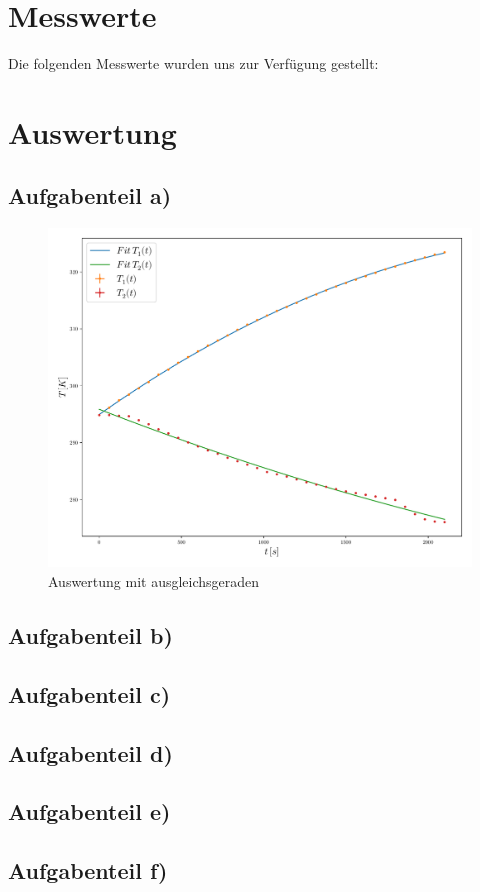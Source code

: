 \newpage
    \section{Messwerte}
    Die folgenden Messwerte wurden uns zur Verfügung gestellt:
    

    \newpage
    \section{Auswertung}
        \subsection{Aufgabenteil a)}
        \begin{figure}
               \centering
               \includegraphics[width=\textwidth]{grafic.pdf}
               \caption{Auswertung mit ausgleichsgeraden}
               \label{fig:grafic}
        \end{figure}


            

        \subsection{Aufgabenteil b)}


        \subsection{Aufgabenteil c)}


        \subsection{Aufgabenteil d)}


        \subsection{Aufgabenteil e)}


        \subsection{Aufgabenteil f)}

        